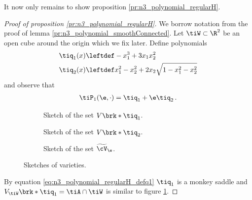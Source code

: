 It now only remains to show proposition \ref{pr:n3_polynomial_regularH}.
\begin{proof}[Proof of proposition \ref{pr:n3_polynomial_regularH}]
  We borrow notation from the proof of lemma \ref{pr:n3_polynomial_smoothConnected}.
  Let $\tiW\subset\R^2$ be an open cube around the origin which we fix later.
  Define polynomials
  \begin{align}
    \tiq_1(x)&\leftdef-x_1^3+3x_1x_2^2\label{eq:n3_polynomial_regularH_defq1} \\ 
    \tiq_2(x)&\leftdef x_1^2-x_2^2+2x_2\sqrt{1-x_1^2-x_2^2} \label{eq:n3_polynomial_regularH_defq2}
  \end{align}
  and observe that
  \begin{align}
    \tiP_1(\e,\cdot)=\tiq_1+\e\tiq_2\,.\label{eq:n3_polynomial_regularH_relTiP}
  \end{align}
  \begin{figure}
    \centering
    \begin{subfigure}[b]{0.3\textwidth}
    \centering
    
    \caption{Sketch of the set $V\brk*{\tiq_1}$.}
    \label{fi:n3_polynomial_intersectionOriginDegenerate}
    \end{subfigure}
    \hfill
    \begin{subfigure}[b]{0.3\textwidth}
    \centering
    
    \caption{Sketch of the set $V\brk*{\tiq_2}$.}
    \label{fi:n3_polynomial_intersectionOriginOtherTerm}
    \end{subfigure}
    \hfill
    \begin{subfigure}[b]{0.3\textwidth}
    \centering
    
    \caption{Sketch of the set $\widetilde{\cV}_\e$.}
    \label{fi:n3_polynomial_intersectionOriginRegular}
    \end{subfigure}
    \caption{Sketches of varieties.}
  \end{figure} %
  By equation \eqref{eq:n3_polynomial_regularH_defq1} $\tiq_1$ is a monkey saddle
  and $V_{\tiW}\brk*{\tiq_1}=\tiA\cap\tiW$ is
  similar to figure \ref{fi:n3_polynomial_intersectionOriginDegenerate}.

\end{proof}
